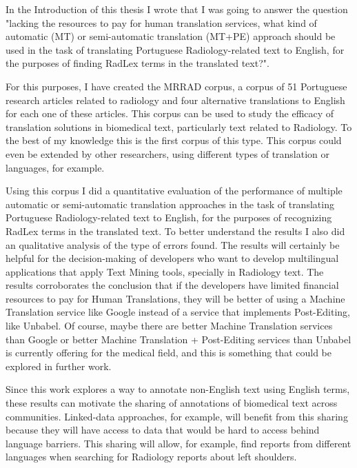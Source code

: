 \label{chap5}

In the Introduction of this thesis I wrote that I was going to answer the question "lacking the resources to pay for human translation services, what kind of automatic (MT) or semi-automatic translation (MT+PE) approach should be used in the task of translating Portuguese Radiology-related text to English, for the purposes of finding RadLex terms in the translated text?". 

For this purposes, I have created the MRRAD corpus, a corpus of 51 Portuguese research articles related to radiology and four alternative translations to English for each one of these articles. This corpus can be used to study the efficacy of translation solutions in biomedical text, particularly text related to Radiology. To the best of my knowledge this is the first corpus of this type. This corpus could even be extended by other researchers, using different types of translation or languages, for example. 

Using this corpus I did a quantitative evaluation of the performance of multiple automatic or semi-automatic translation approaches in the task of translating Portuguese Radiology-related text to English, for the purposes of recognizing RadLex terms in the translated text. To better understand the results I also did an qualitative analysis of the type of errors found. The results will certainly be helpful for the decision-making of developers who want to develop multilingual applications that apply Text Mining tools, specially in Radiology text. The results corroborates the conclusion that if the developers have limited financial resources to pay for Human Translations, they will be better of using a Machine Translation service like Google instead of a service that implements Post-Editing, like Unbabel. Of course, maybe there are better Machine Translation services than Google or better Machine Translation + Post-Editing services than Unbabel is currently offering for the medical field, and this is something that could be explored in further work. 

Since this work explores a way to annotate non-English text using English terms, these results can motivate the sharing of annotations of biomedical text across communities. Linked-data \citep{Barros2016} approaches, for example, will benefit from this sharing because they will have access to data that would be hard to access behind language barriers. This sharing will allow, for example, find reports from different languages when searching for Radiology reports about left shoulders.

